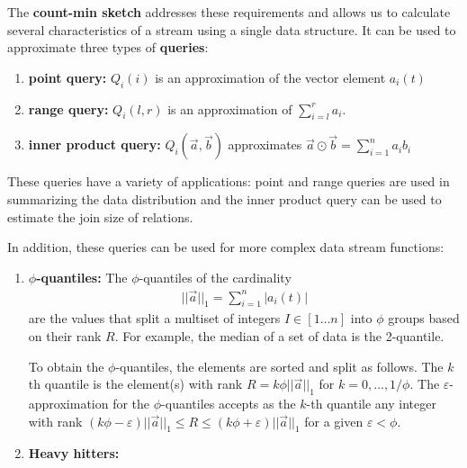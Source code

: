 \documentclass[11pt]{article}
\newcommand{\sq}{\mathit{Q}_i}
\begin{document}
The \textbf{count-min sketch} addresses these requirements and allows us to calculate several characteristics
of a stream using a single data structure.  It can be used to approximate three types of \textbf{queries}:
\begin{enumerate}
    \item \textbf{point query:} $\sq(i)$ is an approximation of the vector 
    element $a_i(t)$
    \item \textbf{range query:} $\sq(l, r)$ is an approximation of 
    $\sum_{i = l}^{r}a_i$. 
    \item \textbf{inner product query:} $\sq(\vec{a}, \vec{b})$ approximates
    $\vec{a} \odot \vec{b} = \sum_{i = 1}^{n} a_i b_i$
\end{enumerate}

These queries have a variety of applications: point and range queries are used in summarizing
the data distribution and the inner product query can be used to estimate the join size of 
relations. 

In addition, these queries can be used for more complex data stream functions:

\begin{enumerate}
    \item \textbf{$\phi$-quantiles:} The $\phi$-quantiles of the cardinality
    \begin{align}
        ||\vec{a}||_1 = \sum_{i = 1}^{n}|a_i(t)|
    \end{align}
    are the values that split a multiset of integers $I \in [1 \dots n]$ into $\phi$ groups based on
    their rank $R$.  For example, the median of a set of data is the 2-quantile. 
    
    To obtain the $\phi$-quantiles, the elements are sorted and split as
    follows.  The $k$th quantile is the element(s) with rank $R =
    k\phi||\vec{a}||_1$ for $k = 0, \dots, 1/\phi$.  The
    $\varepsilon$-approximation for the $\phi$-quantiles accepts as the $k$-th
    quantile any integer with rank $(k\phi - \varepsilon)||\vec{a}||_1 \leq R
    \leq (k\phi + \varepsilon)||\vec{a}||_1$ for a given $\varepsilon < \phi$.
    \item \textbf{Heavy hitters:}
\end{enumerate}
\end{document}
